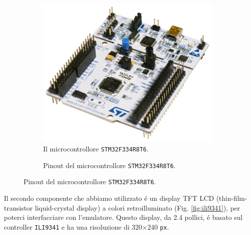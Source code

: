 \documentclass[a4paper]{article}
\begin{document}
\begin{figure}[h!t]
    \begin{subfigure}[b]{0.45\textwidth}
        \begin{center}
            \includegraphics[scale=0.15]{figures/stm32f334.jpg}
        \end{center}
        \caption{Il microcontrollore \texttt{STM32F334R8T6}.}
        \label{fig:stm32f334}
    \end{subfigure}
    \hfill
    \begin{subfigure}[b]{0.45\textwidth}
        \begin{center}
            \begin{tikzpicture}[x=0.015cm, y=0.015cm, scale=0.50, transform shape]
                
            \end{tikzpicture}
        \end{center}
        \caption{Pinout del microcontrollore \texttt{STM32F334R8T6}.}
        \label{fig:pinout_stm32}
    \end{subfigure}
\end{figure}

Il secondo componente che abbiamo utilizzato é un display TFT LCD
(thin-film-transistor liquid-crystal display) a colori retroilluminato
(Fig. \ref{fig:ili9341}),
per poterci interfacciare con l'emulatore. Questo display, da 2.4 pollici,
é basato sul controller \texttt{ILI9341} e ha una risoluzione di
320$\times$240 \texttt{px}.
\end{document}
